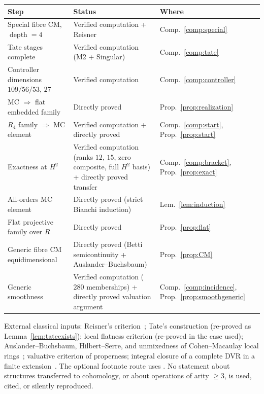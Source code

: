 \documentclass[11pt]{article}
\theoremstyle{definition}
\theoremstyle{remark}
\newcommand{\depth}{\operatorname{depth}}
\begin{document}
\begin{center}
\begin{tabular}{p{}p{}p{}}
\toprule
Step & Status & Where\\
\midrule
Special fibre CM, $\depth=4$ & Verified computation + Reisner &
Comp.~\ref{comp:special}\\
Tate stages complete & Verified computation (M2 + Singular) &
Comp.~\ref{comp:tate}\\
Controller dimensions $109/56/53$, $27$ & Verified computation &
Comp.~\ref{comp:controller}\\
MC $\Rightarrow$ flat embedded family & Directly proved &
Prop.~\ref{prop:realization}\\
$R_4$ family $\Rightarrow$ MC element & Verified computation + directly
proved & Comp.~\ref{comp:start}, Prop.~\ref{prop:start}\\
Exactness at $H^2$ & Verified computation (ranks $12$, $15$, zero
composite, full $H^2$ basis) + directly proved transfer &
Comp.~\ref{comp:bracket}, Prop.~\ref{prop:exact}\\
All-orders MC element & Directly proved (strict Bianchi induction) &
Lem.~\ref{lem:induction}\\
Flat projective family over $R$ & Directly proved &
Prop.~\ref{prop:flat}\\
Generic fibre CM equidimensional & Directly proved (Betti
semicontinuity + Auslander--Buchsbaum) & Prop.~\ref{prop:CM}\\
Generic smoothness & Verified computation ($280$ memberships) + directly
proved valuation argument & Comp.~\ref{comp:incidence},
Prop.~\ref{prop:smoothgeneric}\\
\bottomrule
\end{tabular}
\end{center}

External classical inputs: Reisner's criterion~\cite{Reisner}; Tate's
construction (re-proved as Lemma~\ref{lem:tateexists}); local flatness
criterion \cite[Tag 00MK]{Stacks00MK} (re-proved in the case used);
Auslander--Buchsbaum, Hilbert--Serre, and unmixedness of Cohen--Macaulay
local rings~\cite{BH}; valuative criterion of properness; integral closure
of a complete DVR in a finite extension~\cite{SerreLF}.  The optional
footnote route uses \cite[Tag 0899]{Stacks0899}.  No statement about
structures transferred to cohomology, or about operations of arity
$\geq3$, is used, cited, or silently reproduced.
\end{document}
